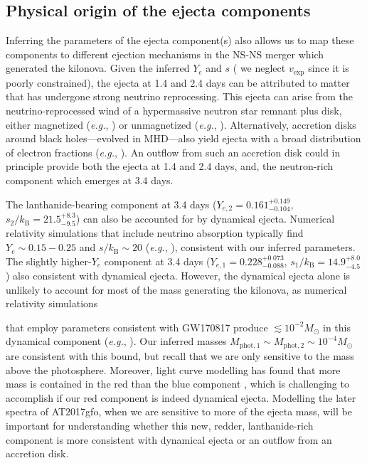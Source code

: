\documentclass[twocolumn,twocolappendix]{aastex63}
\def\eg{{\it e.g.}}
\begin{document}
{%
\subsection{Physical origin of the ejecta components}\label{ssc:disco-origins}

Inferring the parameters of the ejecta component(s) also allows us to map these components to different ejection mechanisms in the NS-NS merger which generated the kilonova. Given the inferred $Y_e$ and $s$ ( we neglect $v_{\mathrm{exp}}$  since it is poorly constrained), the ejecta at 1.4 and 2.4 days can be attributed to matter that has undergone strong neutrino reprocessing. This ejecta can arise from the neutrino-reprocessed wind of a hypermassive neutron star remnant plus disk, either magnetized (\eg, \citealt{combi23,curtis23b,fahlman23,kiuchi23}) or unmagnetized (\eg, \citealt{fujibayashi23,just23}). Alternatively, accretion disks around black holes---evolved in MHD---also yield ejecta with a broad distribution of electron fractions (\eg, \citealt{siegel18, fernandez19, christie19, miller19, just22, fahlman22, hayashi23, curtis23a}). An outflow from such an accretion disk could in principle provide both the ejecta at 1.4 and 2.4 days, and, the neutron-rich component which emerges at 3.4 days. 
 
The lanthanide-bearing component at 3.4 days ($Y_{e,2} = 0.161^{+0.149}_{-0.104}$, $s_2 / k_{\mathrm{B}} = 21.5^{+8.3}_{-9.5}$) can also be accounted for by dynamical ejecta. Numerical relativity simulations that include neutrino absorption typically find $Y_e \sim 0.15 - 0.25$ and $s / k_{\mathrm{B}} \sim 20$ (\eg, \citealt{zappa23}), consistent with our inferred  parameters. The slightly higher-$Y_e$ component at 3.4 days ($Y_{e,1} = 0.228^{+0.073}_{-0.088}$, $s_1 / k_{\mathrm{B}} = 14.9^{+8.0}_{-4.5}$)  also consistent with dynamical ejecta. However, the dynamical ejecta alone is unlikely to account for most of the mass generating the kilonova, as numerical relativity simulations {that employ parameters consistent with GW170817 produce  $\lesssim 10^{-2} M_{\odot}$ in this dynamical component  (\eg, \citealt{shibata17, most19, nedora21}). Our inferred masses $M_{\mathrm{phot},1} \sim M_{\mathrm{phot},2} \sim 10^{-4} M_{\odot}$ are consistent with this bound, but recall that we are only sensitive to the mass above the photosphere. Moreover,  light curve modelling has found that more mass is contained in the red than the blue component \edit1{(\eg, \citealt{cowperthwaite17, chornock17, villar17})}, which is challenging to accomplish if our red component is indeed dynamical ejecta. Modelling the later spectra of AT2017gfo, when we are sensitive to more of the ejecta mass, will be important for understanding whether this new, redder, lanthanide-rich component is more consistent with dynamical ejecta or an outflow from an accretion disk. 


}}
\end{document}
